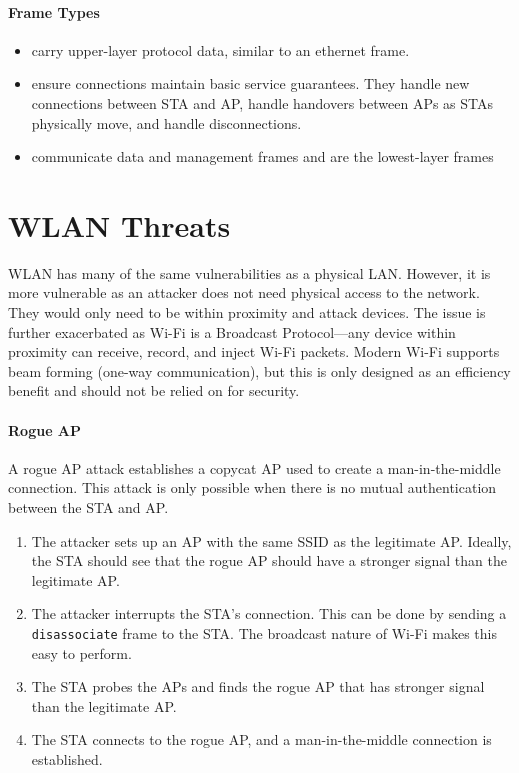 \paragraph{Frame Types}
\begin{itemize}
    \item {} carry upper-layer protocol data, similar to an ethernet frame.
    \item {} ensure connections maintain basic service guarantees. They handle new connections between STA and AP, handle handovers between APs as STAs physically move, and handle disconnections.
    \item {} communicate data and management frames and are the lowest-layer frames
\end{itemize}

\section{WLAN Threats}
WLAN has many of the same vulnerabilities as a physical LAN. However, it is more vulnerable as an attacker does not need physical access to the network. They would only need to be within proximity and attack devices. The issue is further exacerbated as Wi-Fi is a Broadcast Protocol---any device within proximity can receive, record, and inject Wi-Fi packets. Modern Wi-Fi supports beam forming (one-way communication), but this is only designed as an efficiency benefit and should not be relied on for security.

\paragraph{Rogue AP}
A rogue AP attack establishes a copycat AP used to create a man-in-the-middle connection. This attack is only possible when there is no mutual authentication between the STA and AP.
\begin{enumerate}
    \item The attacker sets up an AP with the same SSID as the legitimate AP. Ideally, the STA should see that the rogue AP should have a stronger signal than the legitimate AP.
    \item The attacker interrupts the STA's connection. This can be done by sending a \texttt{disassociate} frame to the STA. The broadcast nature of Wi-Fi makes this easy to perform.
    \item The STA probes the APs and finds the rogue AP that has stronger signal than the legitimate AP.
    \item The STA connects to the rogue AP, and a man-in-the-middle connection is established.
\end{enumerate}


